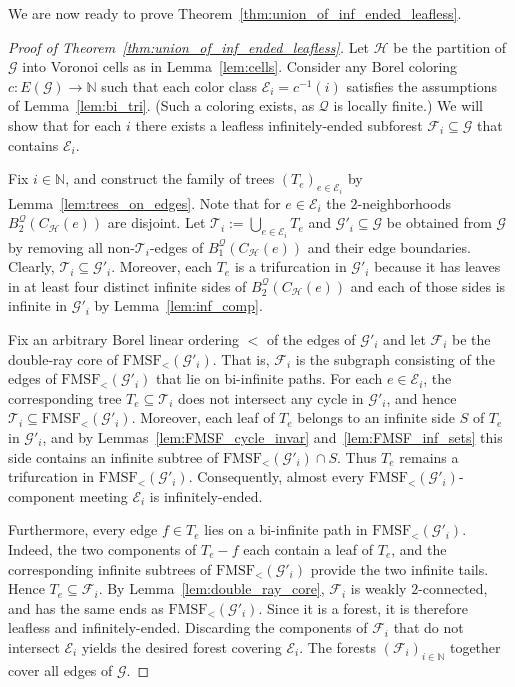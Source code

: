 \documentclass{article}
\theoremstyle{plain}
\theoremstyle{definition}
\newcommand{\N}{\mathbb{N}}
\newcommand{\cG}{\mathcal{G}}
\newcommand{\cQ}{\mathcal{Q}}
\newcommand{\cE}{\mathcal{E}}
\newcommand{\cF}{\mathcal{F}}
\newcommand{\cH}{\mathcal{H}}
\newcommand{\cT}{\mathcal{T}}
\begin{document}
We are now ready to prove Theorem~\ref{thm:union_of_inf_ended_leafless}. 

\begin{proof}[Proof of Theorem~\ref{thm:union_of_inf_ended_leafless}]
    Let $\cH$ be the partition of $\cG$ into Voronoi cells as in Lemma~\ref{lem:cells}. Consider any Borel coloring $c:E(\cG) \to \N$ such that each color class $\cE_i=c^{-1}(i)$ satisfies the assumptions of Lemma~\ref{lem:bi_tri}. (Such a coloring exists, as $\cQ$ is locally finite.) We will show that for each $i$ there exists a leafless infinitely-ended subforest $\cF_i\subseteq \cG$ that contains $\cE_i$.

    Fix $i\in\N$, and construct the family of trees $(T_e)_{e \in \cE_i}$ by Lemma~\ref{lem:trees_on_edges}. Note that for $e\in \cE_i$ the $2$-neighborhoods $B_2^{\cQ}(C_{\cH}(e))$ are disjoint. Let $\cT_i:=\bigcup_{e\in\cE_i} T_e$ and $\cG'_i\subseteq\cG$ be obtained from $\cG$ by removing all non-$\cT_i$-edges of $B_1^{\cQ}(C_{\cH}(e))$ and their edge boundaries. Clearly, $\cT_i\subseteq \cG'_i$. Moreover, each $T_e$ is a trifurcation in $\cG'_i$ because it has leaves in at least four distinct infinite sides of $B_2^{\cQ}(C_{\cH}(e))$ and each of those sides is infinite in $\cG'_i$ by Lemma~\ref{lem:inf_comp}.  

    Fix an arbitrary Borel linear ordering $<$ of the edges of $\cG'_i$ and let $\cF_i$ be the double-ray core of $\mathrm{FMSF}_{<}(\cG'_i)$. That is, $\cF_i$ is the subgraph consisting of the edges of $\mathrm{FMSF}_{<}(\cG'_i)$ that lie on bi-infinite paths. For each $e\in\cE_i$, the corresponding tree $T_e\subseteq\cT_i$ does not intersect any cycle in $\cG'_i$, and hence $\cT_i\subseteq \mathrm{FMSF}_{<}(\cG'_i)$. Moreover, each leaf of $T_e$ belongs to an infinite side $S$ of $T_e$ in $\cG'_i$, and by Lemmas~\ref{lem:FMSF_cycle_invar} and~\ref{lem:FMSF_inf_sets} this side contains an infinite subtree of $\mathrm{FMSF}_{<}(\cG'_i)\cap S$. Thus $T_e$ remains a trifurcation in $\mathrm{FMSF}_{<}(\cG'_i)$. Consequently, almost every $\mathrm{FMSF}_{<}(\cG'_i)$-component meeting $\cE_i$ is infinitely-ended.
    
    Furthermore, every edge $f\in T_e$ lies on a bi-infinite path in    $\mathrm{FMSF}_{<}(\cG'_i)$. Indeed, the two components of $T_e-f$ each contain a leaf of $T_e$, and the corresponding infinite subtrees of $\mathrm{FMSF}_{<}(\cG'_i)$ provide the two infinite tails. Hence $T_e\subseteq\cF_i$. By Lemma~\ref{lem:double_ray_core}, $\cF_i$ is weakly $2$-connected, and has the same ends as $\mathrm{FMSF}_{<}(\cG'_i)$. Since it is a forest, it is therefore leafless and infinitely-ended. Discarding the components of $\cF_i$ that do not intersect $\cE_i$
    yields the desired forest covering $\cE_i$. The forests $(\cF_i)_{i\in\N}$ together cover all edges of $\cG$.
\end{proof}
\end{document}
